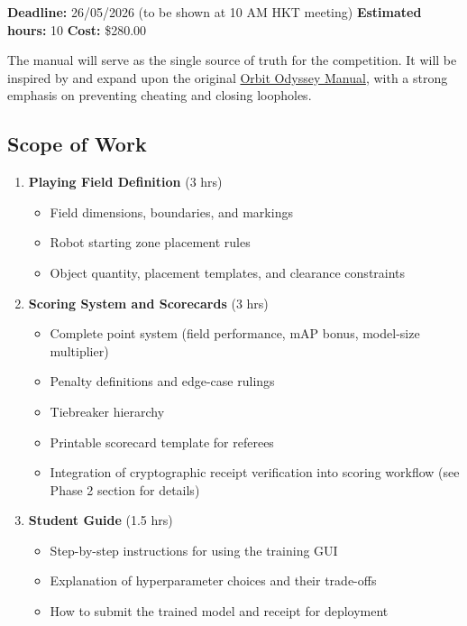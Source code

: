 \documentclass[a4paper]{article}
\begin{document}
\noindent\textbf{Deadline:} 26/05/2026 (to be shown at 10 AM HKT meeting) \hfill \textbf{Estimated hours:} 10 \hfill \textbf{Cost:} \$280.00

\vspace{0.5em}

The manual will serve as the single source of truth for the competition. It will be inspired by and expand upon the original \href{https://docs.google.com/document/d/1N_mCX1EM3w5nDMbHrX3vcQlSqa2yJL38nCU0xxMPxmY/edit?tab=t.0}{Orbit Odyssey Manual}, with a strong emphasis on preventing cheating and closing loopholes.

\subsection*{Scope of Work}

\begin{enumerate}[leftmargin=*]
    \item \textbf{Playing Field Definition} (3 hrs)
    \begin{itemize}
        \item Field dimensions, boundaries, and markings
        \item Robot starting zone placement rules
        \item Object quantity, placement templates, and clearance constraints
    \end{itemize}

    \item \textbf{Scoring System and Scorecards} (3 hrs)
    \begin{itemize}
        \item Complete point system (field performance, mAP bonus, model-size multiplier)
        \item Penalty definitions and edge-case rulings
        \item Tiebreaker hierarchy
        \item Printable scorecard template for referees
        \item Integration of cryptographic receipt verification into scoring workflow (see Phase 2 section for details)
    \end{itemize}

    \item \textbf{Student Guide} (1.5 hrs)
    \begin{itemize}
        \item Step-by-step instructions for using the training GUI
        \item Explanation of hyperparameter choices and their trade-offs
        \item How to submit the trained model and receipt for deployment
    \end{itemize}


\end{enumerate}
\end{document}
